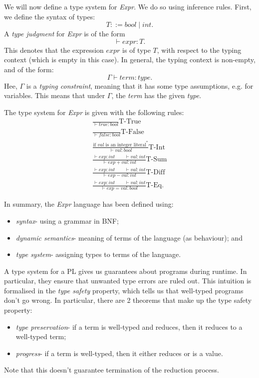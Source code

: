 \documentclass[a4paper, openany]{memoir}
\begin{document}
    We will now define a type system for \textit{Expr}. We do so using inference rules. First, we define the syntax of types:
    \[T ::= \textit{bool} \mid \textit{int}.\]
    A \emph{type judgment} for \textit{Expr} is of the form 
    \[\vdash expr \colon T.\]
    This denotes that the expression $expr$ is of type $T$, with respect to the typing context (which is empty in this case). In general, the typing context is non-empty, and of the form: 
    \[\Gamma \vdash \textit{term} \colon \textit{type}.\]
    Hee, $\Gamma$ is a \emph{typing constraint}, meaning that it has some type assumptions, e.g. for variables. This means that under $\Gamma$, the \textit{term} has the given \textit{type}.

    The type system for \textit{Expr} is given with the following rules:
    \begin{align*}
        \frac{}{\vdash \textit{true} \colon \textit{bool}} \textrm{T-True} \\
        \frac{}{\vdash \textit{false} \colon \textit{bool}} \textrm{T-False} \\
        \frac{\textrm{if } val \textrm{ is an integer literal}^*}{\vdash val \colon \textit{bool}} \textrm{T-Int} \\
        \frac{\vdash exp \colon \textit{int} \qquad \vdash val \colon \textit{int}}{\vdash exp + val \colon \textit{int}} \textrm{T-Sum} \\
        \frac{\vdash exp \colon \textit{int} \qquad \vdash val \colon \textit{int}}{\vdash exp - val \colon \textit{int}} \textrm{T-Diff} \\
        \frac{\vdash exp \colon \textit{int} \qquad \vdash val \colon \textit{int}}{\vdash exp = val \colon \textit{bool}} \textrm{T-Eq}.
    \end{align*}

    In summary, the \textit{Expr} language has been defined using:
    \begin{itemize}
        \item \textit{syntax}- using a grammar in BNF;
        \item \textit{dynamic semantics}- meaning of terms of the language (as behaviour); and
        \item \textit{type system}- assigning types to terms of the language.
    \end{itemize}

    A type system for a PL gives us guarantees about programs during runtime. In particular, they ensure that unwanted type errors are ruled out. This intuition is formalised in the \emph{type safety} property, which tells us that well-typed programs don't go wrong. In particular, there are 2 theorems that make up the type safety property:
    \begin{itemize}
        \item \emph{type preservation}- if a term is well-typed and reduces, then it reduces to a well-typed term;
        \item \emph{progress}- if a term is well-typed, then it either reduces or is a value.
    \end{itemize}
    Note that this doesn't guarantee termination of the reduction process.
\end{document}
